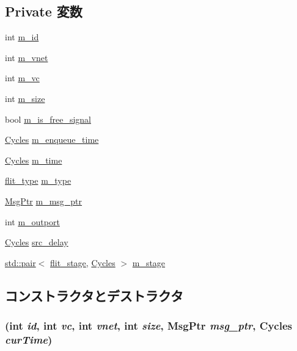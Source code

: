 \subsection*{Private 変数}
\begin{DoxyCompactItemize}
\item 
int \hyperlink{classflit__d_aad966617e7e050bedbead762727808a5}{m\_\-id}
\item 
int \hyperlink{classflit__d_a1834cf79dfe7f6b9d971ceb81bac5716}{m\_\-vnet}
\item 
int \hyperlink{classflit__d_aff451e40c19f8624b8556d1524e0b76f}{m\_\-vc}
\item 
int \hyperlink{classflit__d_a012b2bfbef5380cc57296def37a49a27}{m\_\-size}
\item 
bool \hyperlink{classflit__d_a189488784220926cac62fa5b43f70c19}{m\_\-is\_\-free\_\-signal}
\item 
\hyperlink{classCycles}{Cycles} \hyperlink{classflit__d_a09c7a74d0bb6e5b6d02f0ae0f3fc9264}{m\_\-enqueue\_\-time}
\item 
\hyperlink{classCycles}{Cycles} \hyperlink{classflit__d_ac39faf9ea84c2e7518ba2f960c661636}{m\_\-time}
\item 
\hyperlink{NetworkHeader_8hh_a2c6c8cfc6307d086e578093535798328}{flit\_\-type} \hyperlink{classflit__d_aa57009042826e7caec1a969aaad4a591}{m\_\-type}
\item 
\hyperlink{classRefCountingPtr}{MsgPtr} \hyperlink{classflit__d_afa7739690112aae8964746c5a096d0ae}{m\_\-msg\_\-ptr}
\item 
int \hyperlink{classflit__d_a16ca2ea0721dbf8d63d24c0f110dabd2}{m\_\-outport}
\item 
\hyperlink{classCycles}{Cycles} \hyperlink{classflit__d_a54c59332d73cfbff1539be34bdd8703b}{src\_\-delay}
\item 
\hyperlink{classstd_1_1pair}{std::pair}$<$ \hyperlink{NetworkHeader_8hh_a1af1206699d48009a5cbd0c2c1d7ce15}{flit\_\-stage}, \hyperlink{classCycles}{Cycles} $>$ \hyperlink{classflit__d_a280f0c5b9f0a5ef2abcf62ad2bfa102f}{m\_\-stage}
\end{DoxyCompactItemize}


\subsection{コンストラクタとデストラクタ}
\hypertarget{classflit__d_ac5917ce8e5bb6b61354e557799d84b11}{
\subsubsection[{flit\_\-d}]{ (int {\em id}, \/  int {\em vc}, \/  int {\em vnet}, \/  int {\em size}, \/  {\bf MsgPtr} {\em msg\_\-ptr}, \/  {\bf Cycles} {\em curTime})}}
\label{classflit__d_ac5917ce8e5bb6b61354e557799d84b11}




